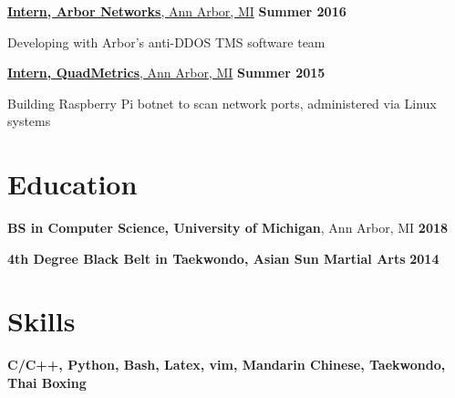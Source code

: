 \documentclass[margin,line]{resume}
\begin{document}
\begin{resume}
    \underline{\textbf{Intern, Arbor Networks}, Ann Arbor, MI}
    \hfill \textbf{Summer 2016} \\

    \begin{list2}
    \item Developing with Arbor's anti-DDOS TMS software team
    \end{list2}

    \underline{\textbf{Intern, QuadMetrics}, Ann Arbor, MI}
    \hfill \textbf{\hfill Summer 2015} \\

    \begin{list2}
    \item Building Raspberry Pi botnet to scan network ports, administered via Linux systems
    \end{list2}


    \section{\mysidestyle Education}
    \hfill

    \textbf{BS in Computer Science, University of Michigan}, Ann Arbor, MI
    \hfill \textbf{\hfill 2018}

    \textbf{4th Degree Black Belt in Taekwondo, Asian Sun Martial Arts}
    \hfill \textbf{\hfill 2014}


    \section{\mysidestyle Skills}
    \hfill

    \textbf{C/C++, Python, Bash, Latex, vim, Mandarin Chinese, Taekwondo, Thai Boxing}

\end{resume}
\end{document}
